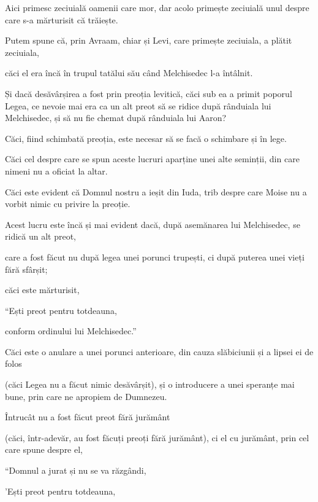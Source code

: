 {Aici primesc zeciuială oamenii care mor, dar acolo primește zeciuială unul despre care s-a mărturisit că trăiește.

Putem spune că, prin Avraam, chiar și Levi, care primește zeciuiala, a plătit zeciuiala,

căci el era încă în trupul tatălui său când Melchisedec l-a întâlnit.


\par }{\PP {}Și dacă desăvârșirea a fost prin preoția levitică, căci sub ea a primit poporul Legea, ce nevoie mai era ca un alt preot să se ridice după rânduiala lui Melchisedec, și să nu fie chemat după rânduiala lui Aaron?

Căci, fiind schimbată preoția, este necesar să se facă o schimbare și în lege.

Căci cel despre care se spun aceste lucruri aparține unei alte seminții, din care nimeni nu a oficiat la altar.

Căci este evident că Domnul nostru a ieșit din Iuda, trib despre care Moise nu a vorbit nimic cu privire la preoție.

Acest lucru este încă și mai evident dacă, după asemănarea lui Melchisedec, se ridică un alt preot,

care a fost făcut nu după legea unei porunci trupești, ci după puterea unei vieți fără sfârșit;

căci este mărturisit,

\par }{\Q “Ești preot pentru totdeauna,

\par }{\QB conform ordinului lui Melchisedec.”


\par }{\PP {}Căci este o anulare a unei porunci anterioare, din cauza slăbiciunii și a lipsei ei de folos

(căci Legea nu a făcut nimic desăvârșit), și o introducere a unei speranțe mai bune, prin care ne apropiem de Dumnezeu.

Întrucât nu a fost făcut preot fără jurământ

(căci, într-adevăr, au fost făcuți preoți fără jurământ), ci el cu jurământ, prin cel care spune despre el,

\par }{\Q “Domnul a jurat și nu se va răzgândi,

\par }{\QB 'Ești preot pentru totdeauna,

}
